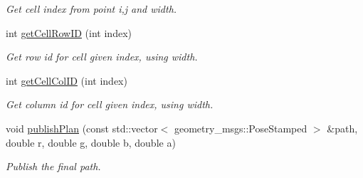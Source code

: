 \begin{DoxyCompactItemize}
\begin{DoxyCompactList}\small\item\em Get cell index from point i,j and width. \end{DoxyCompactList}\item 
int \hyperlink{class_r_astar__planner_1_1_r_astar_planner_r_o_s_af17757b32cb946011d64fa9478395bdf}{get\+Cell\+Row\+ID} (int index)
\begin{DoxyCompactList}\small\item\em Get row id for cell given index, using width. \end{DoxyCompactList}\item 
int \hyperlink{class_r_astar__planner_1_1_r_astar_planner_r_o_s_ae6ea4452952f573c9554b9680c2e9d3d}{get\+Cell\+Col\+ID} (int index)
\begin{DoxyCompactList}\small\item\em Get column id for cell given index, using width. \end{DoxyCompactList}\item 
void \hyperlink{class_r_astar__planner_1_1_r_astar_planner_r_o_s_a0ea613cb0c57682fd0ce840bbf5ed1d5}{publish\+Plan} (const std\+::vector$<$ geometry\+\_\+msgs\+::\+Pose\+Stamped $>$ \&path, double r, double g, double b, double a)
\begin{DoxyCompactList}\small\item\em Publish the final path. \end{DoxyCompactList}\end{DoxyCompactItemize}
